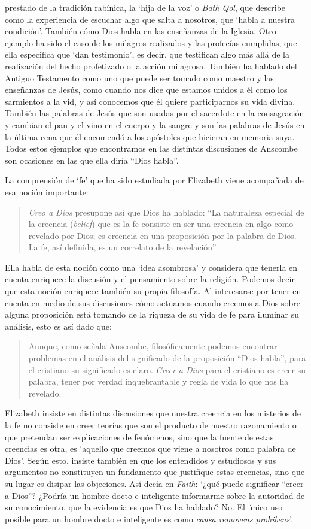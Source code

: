 prestado de la tradición rabínica, la `hija de la voz' o \emph{Bath Qol}, que describe como la experiencia de escuchar algo que salta a nosotros, que `habla a nuestra condición'. También cómo Dios habla en las enseñanzas de la Iglesia. Otro ejemplo ha sido el caso de los milagros realizados y las profecías cumplidas, que ella especifica que `dan testimonio', es decir, que testifican algo más allá de la realización del hecho profetizado o la acción milagrosa. También ha hablado del Antiguo Testamento como uno que puede ser tomado como maestro y las enseñanzas de Jesús, como cuando nos dice que estamos unidos a él como los sarmientos a la vid, y así conocemos que él quiere participarnos su vida divina. También las palabras de Jesús que son usadas por el sacerdote en la consagración y cambian el pan y el vino en el cuerpo y la sangre y son las palabras de Jesús en la última cena que él encomendó a los apóstoles que hicieran en memoria suya. Todos estos ejemplos que encontramos en las distintas discusiones de Anscombe son ocasiones en las que ella diría ``Dios habla''.

La comprensión de `fe' que ha sido estudiada por Elizabeth viene acompañada de esa noción importante: \blockquote[{\cite[185]{conesa1994cc}}]{\emph{Creo a Dios} presupone así que Dios ha hablado: \enquote{La naturaleza especial de la creencia (\emph{belief}) que es la fe consiste en ser una creencia en algo como revelado por Dios; es creencia en una proposición por la palabra de Dios. La fe, así definida, es un correlato de la revelación}}. Ella habla de esta noción como una `idea asombrosa' y considera que tenerla en cuenta enriquece la discusión y el pensamiento sobre la religión. Podemos decir que esta noción enriquece también su propia filosofía. Al interesarse por tener en cuenta en medio de sus discusiones cómo actuamos cuando creemos a Dios sobre alguna proposición está tomando de la riqueza de su vida de fe para iluminar su análisis, esto es así dado que: \blockquote[{\cite[185]{conesa1994cc}}]{Aunque, como señala Anscombe, filosóficamente podemos encontrar problemas en el análisis del significado de la proposición \enquote{Dios habla}, para el cristiano su significado es claro. \emph{Creer a Dios} para el cristiano es creer su palabra, tener por verdad inquebrantable y regla de vida lo que nos ha revelado.} Elizabeth insiste en distintas discusiones que nuestra creencia en los misterios de la fe no consiste en creer teorías que son el producto de nuestro razonamiento o que pretendan ser explicaciones de fenómenos, sino que la fuente de estas creencias es otra, es \enquote*{aquello que creemos que viene a nosotros como palabra de Dios}. Según esto, insiste también en que los entendidos y estudiosos y sus argumentos no constituyen un fundamento que justifique estas creencias, sino que su lugar es disipar las objeciones. Así decía en \emph{Faith}: \enquote*{¿qué puede significar ``creer a Dios''? ¿Podría un hombre docto e inteligente informarme sobre la autoridad de su conocimiento, que la evidencia es que Dios ha hablado? No. El único uso posible para un hombre docto e inteligente es como \emph{causa removens prohibens}}.

